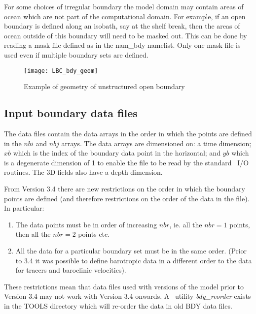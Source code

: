 \documentclass[../main/NEMO_manual]{subfiles}
\begin{document}
For some choices of irregular boundary the model domain may contain areas of ocean which
are not part of the computational domain.
For example, if an open boundary is defined along an isobath, say at the shelf break,
then the areas of ocean outside of this boundary will need to be masked out.
This can be done by reading a mask file defined as  in the nam\_bdy namelist.
Only one mask file is used even if multiple boundary sets are defined.

\begin{figure}[!t]
  \centering
  \texttt{[image: LBC\_bdy\_geom]}
  \caption[Geometry of unstructured open boundary]{Example of geometry of unstructured open boundary}
  \label{fig:LBC_bdy_geom}
\end{figure}

\subsection{Input boundary data files}
\label{subsec:LBC_bdy_data}

The data files contain the data arrays in the order in which the points are defined in the $nbi$ and $nbj$ arrays.
The data arrays are dimensioned on:
a time dimension;
$xb$ which is the index of the boundary data point in the horizontal;
and $yb$ which is a degenerate dimension of 1 to enable the file to be read by the standard \NEMO\ I/O routines.
The 3D fields also have a depth dimension.

From Version 3.4 there are new restrictions on the order in which the boundary points are defined
(and therefore restrictions on the order of the data in the file).
In particular:

\begin{enumerate}
\item The data points must be in order of increasing $nbr$,
  ie. all the $nbr=1$ points, then all the $nbr=2$ points etc.
\item All the data for a particular boundary set must be in the same order.
  (Prior to 3.4 it was possible to define barotropic data in a different order to
  the data for tracers and baroclinic velocities).
\end{enumerate}

These restrictions mean that data files used with versions of the
model prior to Version 3.4 may not work with Version 3.4 onwards.
A \fortran\ utility {\itshape bdy\_reorder} exists in the TOOLS directory which
will re-order the data in old BDY data files.
\end{document}
